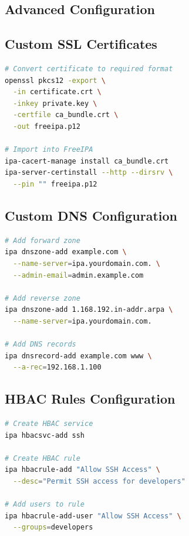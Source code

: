 \documentclass[12pt,a4paper]{report}
\begin{document}
\begin{appendices}

\chapter{Advanced Configuration}

\section{Custom SSL Certificates}

\begin{lstlisting}[language=bash,caption=Install Custom SSL Certificate]
# Convert certificate to required format
openssl pkcs12 -export \
  -in certificate.crt \
  -inkey private.key \
  -certfile ca_bundle.crt \
  -out freeipa.p12

# Import into FreeIPA
ipa-cacert-manage install ca_bundle.crt
ipa-server-certinstall --http --dirsrv \
  --pin "" freeipa.p12
\end{lstlisting}

\section{Custom DNS Configuration}

\begin{lstlisting}[language=bash,caption=Configure Custom DNS Zones]
# Add forward zone
ipa dnszone-add example.com \
  --name-server=ipa.yourdomain.com. \
  --admin-email=admin.example.com

# Add reverse zone
ipa dnszone-add 1.168.192.in-addr.arpa \
  --name-server=ipa.yourdomain.com.

# Add DNS records
ipa dnsrecord-add example.com www \
  --a-rec=192.168.1.100
\end{lstlisting}

\section{HBAC Rules Configuration}

\begin{lstlisting}[language=bash,caption=Host-Based Access Control]
# Create HBAC service
ipa hbacsvc-add ssh

# Create HBAC rule
ipa hbacrule-add "Allow SSH Access" \
  --desc="Permit SSH access for developers"

# Add users to rule
ipa hbacrule-add-user "Allow SSH Access" \
  --groups=developers


\end{lstlisting}
\end{appendices}
\end{document}
